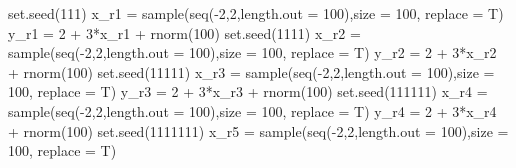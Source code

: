 \documentclass[
  letterpaper,
  DIV=11,
  numbers=noendperiod]{scrreprt}
\newenvironment{Shaded}{\begin{snugshade}}{\end{snugshade}}
\newcommand{\AttributeTok}[1]{\textcolor[rgb]{0.40,0.45,0.13}{#1}}
\newcommand{\DecValTok}[1]{\textcolor[rgb]{0.68,0.00,0.00}{#1}}
\newcommand{\FunctionTok}[1]{\textcolor[rgb]{0.28,0.35,0.67}{#1}}
\newcommand{\NormalTok}[1]{\textcolor[rgb]{0.00,0.23,0.31}{#1}}
\newcommand{\OtherTok}[1]{\textcolor[rgb]{0.00,0.23,0.31}{#1}}
\newcommand{\SpecialCharTok}[1]{\textcolor[rgb]{0.37,0.37,0.37}{#1}}
\begin{document}
\begin{Shaded}
\begin{Highlighting}[]
\FunctionTok{set.seed}\NormalTok{(}\DecValTok{111}\NormalTok{)}
\NormalTok{x\_r1 }\OtherTok{=} \FunctionTok{sample}\NormalTok{(}\FunctionTok{seq}\NormalTok{(}\SpecialCharTok{{-}}\DecValTok{2}\NormalTok{,}\DecValTok{2}\NormalTok{,}\AttributeTok{length.out =} \DecValTok{100}\NormalTok{),}\AttributeTok{size =} \DecValTok{100}\NormalTok{, }\AttributeTok{replace =}\NormalTok{ T)}
\NormalTok{y\_r1 }\OtherTok{=} \DecValTok{2} \SpecialCharTok{+} \DecValTok{3}\SpecialCharTok{*}\NormalTok{x\_r1 }\SpecialCharTok{+} \FunctionTok{rnorm}\NormalTok{(}\DecValTok{100}\NormalTok{)}
\FunctionTok{set.seed}\NormalTok{(}\DecValTok{1111}\NormalTok{)}
\NormalTok{x\_r2 }\OtherTok{=} \FunctionTok{sample}\NormalTok{(}\FunctionTok{seq}\NormalTok{(}\SpecialCharTok{{-}}\DecValTok{2}\NormalTok{,}\DecValTok{2}\NormalTok{,}\AttributeTok{length.out =} \DecValTok{100}\NormalTok{),}\AttributeTok{size =} \DecValTok{100}\NormalTok{, }\AttributeTok{replace =}\NormalTok{ T)}
\NormalTok{y\_r2 }\OtherTok{=} \DecValTok{2} \SpecialCharTok{+} \DecValTok{3}\SpecialCharTok{*}\NormalTok{x\_r2 }\SpecialCharTok{+} \FunctionTok{rnorm}\NormalTok{(}\DecValTok{100}\NormalTok{)}
\FunctionTok{set.seed}\NormalTok{(}\DecValTok{11111}\NormalTok{)}
\NormalTok{x\_r3 }\OtherTok{=} \FunctionTok{sample}\NormalTok{(}\FunctionTok{seq}\NormalTok{(}\SpecialCharTok{{-}}\DecValTok{2}\NormalTok{,}\DecValTok{2}\NormalTok{,}\AttributeTok{length.out =} \DecValTok{100}\NormalTok{),}\AttributeTok{size =} \DecValTok{100}\NormalTok{, }\AttributeTok{replace =}\NormalTok{ T)}
\NormalTok{y\_r3 }\OtherTok{=} \DecValTok{2} \SpecialCharTok{+} \DecValTok{3}\SpecialCharTok{*}\NormalTok{x\_r3 }\SpecialCharTok{+} \FunctionTok{rnorm}\NormalTok{(}\DecValTok{100}\NormalTok{)}
\FunctionTok{set.seed}\NormalTok{(}\DecValTok{111111}\NormalTok{)}
\NormalTok{x\_r4 }\OtherTok{=} \FunctionTok{sample}\NormalTok{(}\FunctionTok{seq}\NormalTok{(}\SpecialCharTok{{-}}\DecValTok{2}\NormalTok{,}\DecValTok{2}\NormalTok{,}\AttributeTok{length.out =} \DecValTok{100}\NormalTok{),}\AttributeTok{size =} \DecValTok{100}\NormalTok{, }\AttributeTok{replace =}\NormalTok{ T)}
\NormalTok{y\_r4 }\OtherTok{=} \DecValTok{2} \SpecialCharTok{+} \DecValTok{3}\SpecialCharTok{*}\NormalTok{x\_r4 }\SpecialCharTok{+} \FunctionTok{rnorm}\NormalTok{(}\DecValTok{100}\NormalTok{)}
\FunctionTok{set.seed}\NormalTok{(}\DecValTok{1111111}\NormalTok{)}
\NormalTok{x\_r5 }\OtherTok{=} \FunctionTok{sample}\NormalTok{(}\FunctionTok{seq}\NormalTok{(}\SpecialCharTok{{-}}\DecValTok{2}\NormalTok{,}\DecValTok{2}\NormalTok{,}\AttributeTok{length.out =} \DecValTok{100}\NormalTok{),}\AttributeTok{size =} \DecValTok{100}\NormalTok{, }\AttributeTok{replace =}\NormalTok{ T)}

\end{Highlighting}
\end{Shaded}
\end{document}
